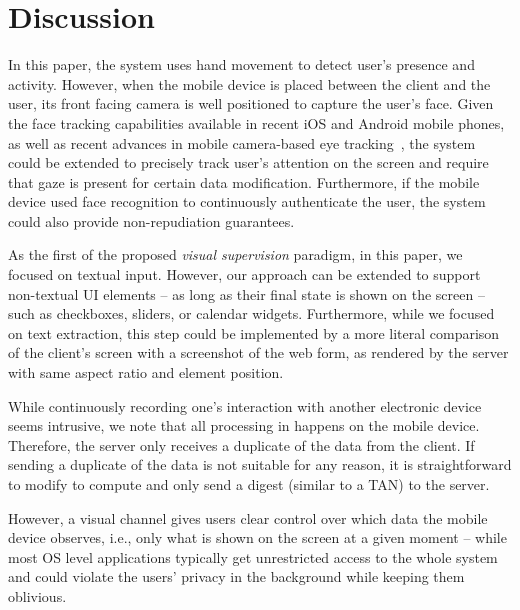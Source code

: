 \section{Discussion} \label{sec:discussion}


In this paper, the system uses hand movement to detect user's presence and activity.
However, when the mobile device is placed between the client and the user, its front facing camera is well positioned to capture the user's face.
Given the face tracking capabilities available in recent iOS and Android mobile phones, as well as recent advances in mobile camera-based eye tracking~\cite{krafka2016eye}, the system could be extended to precisely track user's attention on the screen and require that gaze is present for certain data modification.
Furthermore, if the mobile device used face recognition to continuously authenticate the user, the system could also provide non-repudiation guarantees.


As the first of the proposed \textit{visual supervision} paradigm, in this paper, we focused on textual input.
However, our approach can be extended to support non-textual UI elements -- as long as their final state is shown on the screen -- such as checkboxes, sliders, or calendar widgets.
Furthermore, while we focused on text extraction, this step could be implemented by a more literal comparison of the client's screen with a screenshot of the web form, as rendered by the server with same aspect ratio and element position.

While continuously recording one's interaction with another electronic device seems intrusive, we note that all processing in \sysname happens on the mobile device.
Therefore, the server only receives a duplicate of the data from the client.
If sending a duplicate of the data is not suitable for any reason, it is straightforward to modify \name to compute and only send a digest (similar to a TAN) to the server.

However, a visual channel gives users clear control over which data the mobile device observes, i.e., only what is shown on the screen at a given moment -- while most OS level applications typically get unrestricted access to the whole system and could violate the users' privacy in the background while keeping them oblivious.

